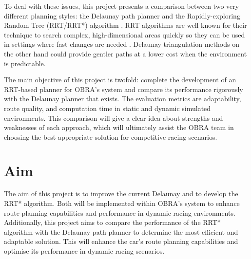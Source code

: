 \documentclass[a4paper,11pt]{report}
\begin{document}
To deal with these issues, this project presents a comparison between two very different planning styles: the Delaunay path planner and the Rapidly-exploring Random Tree (RRT/RRT*) algorithm \cite{reference1}. 
RRT algorithms are well known for their technique to search complex, high-dimensional areas quickly so they can be used in settings where fast changes are needed \cite{reference2}. Delaunay triangulation methods 
on the other hand could provide gentler paths at a lower cost when the environment is predictable.

The main objective of this project is twofold: complete the development of an RRT-based planner for OBRA’s system and compare its performance rigorously with the Delaunay planner that exists. 
The evaluation metrics are adaptability, route quality, and computation time in static and dynamic simulated environments. This comparison will give a clear idea about 
strengths and weaknesses of each approach, which will ultimately assist the OBRA team in choosing the best appropriate solution for competitive racing scenarios.

\section{Aim}

The aim of this project is to improve the current Delaunay and to develop the RRT* algorithm. 
Both will be implemented within OBRA's system to enhance route planning capabilities and performance in dynamic racing environments. 
Additionally, this project aims to compare the performance of the RRT* algorithm with the  Delaunay path planner to 
determine the most efficient and adaptable solution. This will enhance the car's route 
planning capabilities and optimise its performance in dynamic racing scenarios.
\end{document}

